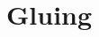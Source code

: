 \documentclass{article}
\begin{document}






















\section{Gluing}

\section{}
\end{document}
